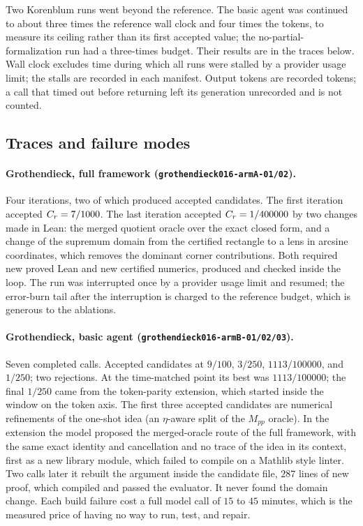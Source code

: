Two Korenblum runs went beyond the reference. The basic agent was continued to
about three times the reference wall clock and four times the tokens, to
measure its ceiling rather than its first accepted value; the
no-partial-formalization run had a three-times budget. Their results are in
the traces below. Wall clock excludes time during which all runs were stalled
by a provider usage limit; the stalls are recorded in each manifest. Output
tokens are recorded tokens; a call that timed out before returning left its
generation unrecorded and is not counted.

\subsection{Traces and failure modes}

\paragraph{Grothendieck, full framework (\texttt{grothendieck016-armA-01/02}).}
Four iterations, two of which produced accepted candidates. The first iteration
accepted $C_r = 7/1000$. The last iteration accepted $C_r = 1/400000$ by two
changes made in Lean: the merged quotient oracle over the exact closed form, and
a change of the supremum domain from the certified rectangle to a lens in
arcsine coordinates, which removes the dominant corner contributions. Both
required new proved Lean and new certified numerics, produced and checked inside
the loop. The run was interrupted once by a provider usage limit and resumed;
the error-burn tail after the interruption is charged to the reference budget,
which is generous to the ablations.

\paragraph{Grothendieck, basic agent (\texttt{grothendieck016-armB-01/02/03}).}
Seven completed calls. Accepted candidates at $9/100$, $3/250$, $1113/100000$,
and $1/250$; two rejections. At the time-matched point its best was
$1113/100000$; the final $1/250$ came from the token-parity extension, which
started inside the window on the token axis. The first three accepted candidates
are numerical refinements of the one-shot idea (an $\eta$-aware split of the
$M_{pp}$ oracle). In the extension the model proposed the merged-oracle route
of the full framework, with the same exact identity and cancellation and no
trace of the idea in its context, first as a new library module, which failed to
compile on a Mathlib style linter. Two calls later it rebuilt the argument inside
the candidate file, $287$ lines of new proof, which compiled and passed the
evaluator. It never found the domain change. Each build failure cost a full
model call of $15$ to $45$ minutes, which is the measured price of having no
way to run, test, and repair.

